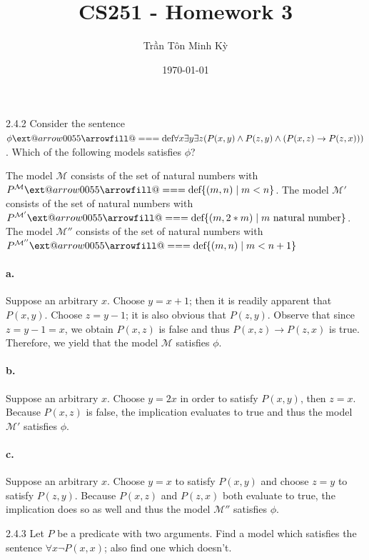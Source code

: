 \documentclass{exam}
\title{CS251 - Homework 3}
\author{\foreignlanguage{vietnamese}{Trần Tôn Minh Kỳ}}
\date{\today}
\makeatletter
\def\@xequals@fill{\arrowfill@\Relbar\Relbar\Relbar}
\newcommand*\xequals[2][]{\DOTSB\ext@arrow0055\@xequals@fill{#1}{#2}}
\makeatother
\begin{document}
\maketitle
\begin{problem}{2.4.2}
	Consider the sentence $\phi \xequals{\text{def}} \forall x \exists y \exists z (P(x, y) \land P(z, y) \land (P(x, z) \rightarrow P(z, x)))$. Which of the following models satisfies $\phi$?
	\begin{tasks}[label=\textbf{\alph*.}]
		\task The model $\mathcal M$ consists of the set of natural numbers with $P^{\mathcal M} \xequals{\text{def}} \{(m, n) \mid m < n\}$.
		\task The model $\mathcal M'$ consists of the set of natural numbers with $P^{\mathcal M'} \xequals{\text{def}} \{(m, 2*m) \mid m \text{ natural number}\}$.
		\task The model $\mathcal M''$ consists of the set of natural numbers with $P^{\mathcal M''} \xequals{\text{def}} \{(m, n) \mid m < n + 1\}$
	\end{tasks}
\end{problem}

\paragraph{a.} Suppose an arbitrary $x$. Choose $y = x + 1$; then it is readily apparent that $P(x, y)$. Choose $z = y - 1$; it is also obvious that $P(z, y)$. Observe that since $z = y - 1 = x$, we obtain $P(x, z)$ is false and thus $P(x, z) \rightarrow P(z, x)$ is true. Therefore, we yield that the model $\mathcal M$ satisfies $\phi$.

\paragraph{b.} Suppose an arbitrary $x$. Choose $y = 2x$ in order to satisfy $P(x, y)$, then $z = x$. Because $P(x, z)$ is false, the implication evaluates to true and thus the model $\mathcal M'$ satisfies $\phi$.

\paragraph{c.} Suppose an arbitrary $x$. Choose $y = x$ to satisfy $P(x, y)$ and choose $z = y$ to satisfy $P(z, y)$. Because $P(x, z)$ and $P(z, x)$ both evaluate to true, the implication does so as well and thus the model $\mathcal M''$ satisfies $\phi$.

\begin{problem}{2.4.3}
	Let $P$ be a predicate with two arguments. Find a model which satisfies the sentence $\forall x \lnot P(x, x)$; also find one which doesn't.
\end{problem}
\end{document}
